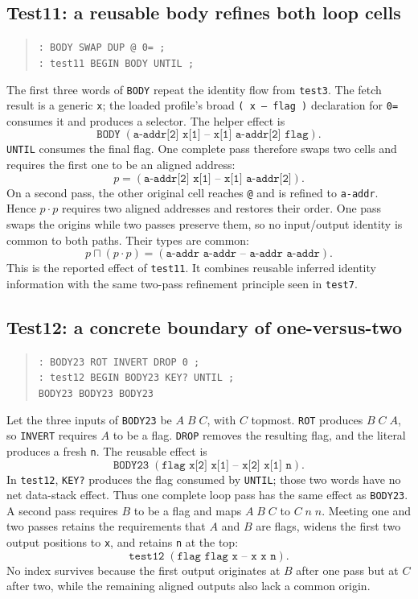 \documentclass[11pt,a4paper]{article}
\newcommand{\effect}[1]{\mbox{\texttt{#1}}}
\newcommand{\meet}{\mathbin{\sqcap}}
\newcommand{\seq}{\mathbin{\cdot}}
\begin{document}
\subsection{Test11: a reusable body refines both loop cells}

\begin{quote}
\texttt{: BODY SWAP DUP @ 0= ;}\\
\texttt{: test11 BEGIN BODY UNTIL ;}
\end{quote}
The first three words of \texttt{BODY} repeat the identity flow from
\texttt{test3}.  The fetch result is a generic \texttt{x}; the loaded profile's
broad \effect{( x -- flag )} declaration for \texttt{0=} consumes it and
produces a selector.  The helper effect is
\[
 \texttt{BODY}\;(\texttt{a-addr[2] x[1] --
                         x[1] a-addr[2] flag}).
\]
\texttt{UNTIL} consumes the final flag.  One complete pass therefore swaps two
cells and requires the first one to be an aligned address:
\[
 p=(\texttt{a-addr[2] x[1] -- x[1] a-addr[2]}).
\]
On a second pass, the other original cell reaches \texttt{@} and is refined to
\texttt{a-addr}.  Hence $p\seq p$ requires two aligned addresses and restores
their order.  One pass swaps the origins while two passes preserve them, so no
input/output identity is common to both paths.  Their types are common:
\[
 p\meet(p\seq p)
   =(\texttt{a-addr a-addr -- a-addr a-addr}).
\]
This is the reported effect of \texttt{test11}.  It combines reusable inferred
identity information with the same two-pass refinement principle seen in
\texttt{test7}.

\subsection{Test12: a concrete boundary of one-versus-two}

\begin{quote}
\texttt{: BODY23 ROT INVERT DROP 0 ;}\\
\texttt{: test12 BEGIN BODY23 KEY? UNTIL ;}\\
\texttt{BODY23 BODY23 BODY23}
\end{quote}
Let the three inputs of \texttt{BODY23} be $A\;B\;C$, with $C$ topmost.
\texttt{ROT} produces $B\;C\;A$, so \texttt{INVERT} requires $A$ to be a
flag.  \texttt{DROP} removes the resulting flag, and the literal produces a
fresh \texttt{n}.  The reusable effect is
\[
 \texttt{BODY23}\;(\texttt{flag x[2] x[1] -- x[2] x[1] n}).
\]
In \texttt{test12}, \texttt{KEY?} produces the flag consumed by
\texttt{UNTIL}; those two words have no net data-stack effect.  Thus one
complete loop pass has the same effect as \texttt{BODY23}.  A second pass
requires $B$ to be a flag and maps $A\;B\;C$ to $C\;n\;n$.  Meeting one and two
passes retains the requirements that $A$ and $B$ are flags, widens the first
two output positions to \texttt{x}, and retains \texttt{n} at the top:
\[
 \texttt{test12}\;(\texttt{flag flag x -- x x n}).
\]
No index survives because the first output originates at $B$ after one pass
but at $C$ after two, while the remaining aligned outputs also lack a common
origin.
\end{document}
